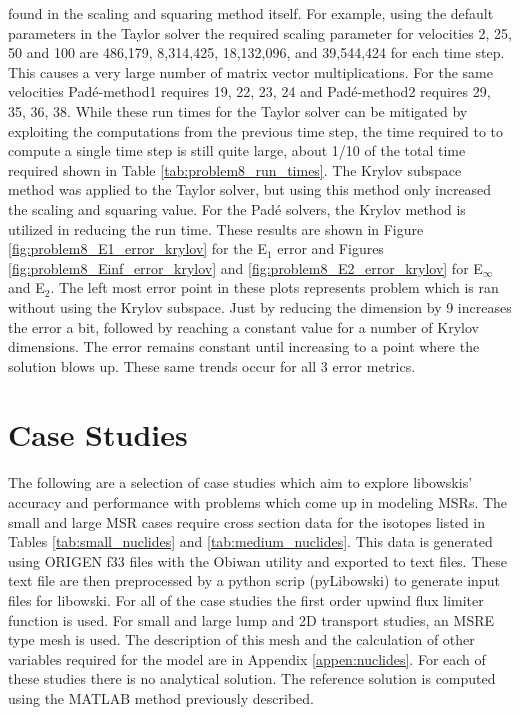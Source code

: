 \noindent found in the scaling and squaring method itself. For example, using the default parameters in the Taylor solver the required scaling parameter for velocities 2, 25, 50 and 100 are 486,179, 8,314,425, 18,132,096, and 39,544,424 for each time step. This causes a very large number of matrix vector multiplications. For the same velocities Pad\'e-method1 requires 19, 22, 23, 24 and Pad\'e-method2 requires 29, 35, 36, 38. While these run times for the Taylor solver can be mitigated by exploiting the computations from the previous time step, the time required to to compute a single time step is still quite large, about 1/10 of the total time required shown in Table \ref{tab:problem8_run_times}. The Krylov subspace method was applied to the Taylor solver, but using this method only increased the scaling and squaring value. For the Pad\'e solvers, the Krylov method is utilized in reducing the run time. These results are shown in Figure \ref{fig:problem8_E1_error_krylov} for the E$_{1}$ error and Figures \ref{fig:problem8_Einf_error_krylov} and \ref{fig:problem8_E2_error_krylov} for E$_{\infty}$ and E$_{2}$. The left most error point in these plots represents problem which is ran without using the Krylov subspace. Just by reducing the dimension by 9 increases the error a bit, followed by reaching a constant value for a number of Krylov dimensions. The error remains constant until increasing to a point where the solution blows up. These same trends occur for all 3 error metrics. 

\section{Case Studies}
The following are a selection of case studies which aim to explore libowskis' accuracy and performance with problems which come up in modeling MSRs. The small and large MSR cases require cross section data for the isotopes listed in Tables \ref{tab:small_nuclides} and \ref{tab:medium_nuclides}. This data is generated using ORIGEN f33 files with the Obiwan utility and exported to text files. These text file are then preprocessed by a python scrip (pyLibowski) to generate input files for libowski. For all of the case studies the first order upwind flux limiter function is used. For small and large lump and 2D transport studies, an MSRE type mesh is used. The description of this mesh and the calculation of other variables required for the model are in Appendix \ref{appen:nuclides}. For each of these studies there is no analytical solution. The reference solution is computed using the MATLAB method previously described. 

